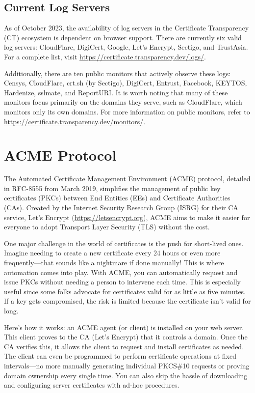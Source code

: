 \subsection{Current Log Servers}

As of October 2023, the availability of log servers in the Certificate
Transparency (CT) ecosystem is dependent on browser support. There are
currently six valid log servers: CloudFlare, DigiCert, Google, Let’s
Encrypt, Sectigo, and TrustAsia. For a complete list, visit
\url{https://certificate.transparency.dev/logs/}.

Additionally, there are ten public monitors that actively observe
these logs: Censys, CloudFlare, crt.sh (by Sectigo), DigiCert,
Entrust, Facebook, KEYTOS, Hardenize, sslmate, and ReportURI. It is
worth noting that many of these monitors focus primarily on the
domains they serve, such as CloudFlare, which monitors only its own
domains. For more information on public monitors, refer to
\url{https://certificate.transparency.dev/monitors/}.

\section{ACME Protocol}

The Automated Certificate Management Environment (ACME) protocol,
detailed in RFC-8555 from March 2019, simplifies the management of
public key certificates (PKCs) between End Entities (EEs) and
Certificate Authorities (CAs). Created by the Internet Security
Research Group (ISRG) for their CA service, Let’s Encrypt
(\url{https://letsencrypt.org}), ACME aims to make it easier for
everyone to adopt Transport Layer Security (TLS) without the cost.

One major challenge in the world of certificates is the push for
short-lived ones. Imagine needing to create a new certificate every 24
hours or even more frequently—that sounds like a nightmare if done
manually! This is where automation comes into play. With ACME, you can
automatically request and issue PKCs without needing a person to
intervene each time. This is especially useful since some folks
advocate for certificates valid for as little as five minutes. If a
key gets compromised, the risk is limited because the certificate
isn’t valid for long.

Here’s how it works: an ACME agent (or client) is installed on your
web server. This client proves to the CA (Let’s Encrypt) that it
controls a domain. Once the CA verifies this, it allows the client to
request and install certificates as needed. The client can even be
programmed to perform certificate operations at fixed intervals—no
more manually generating individual PKCS\#10 requests or proving domain
ownership every single time. You can also skip the hassle of
downloading and configuring server certificates with ad-hoc
procedures.

